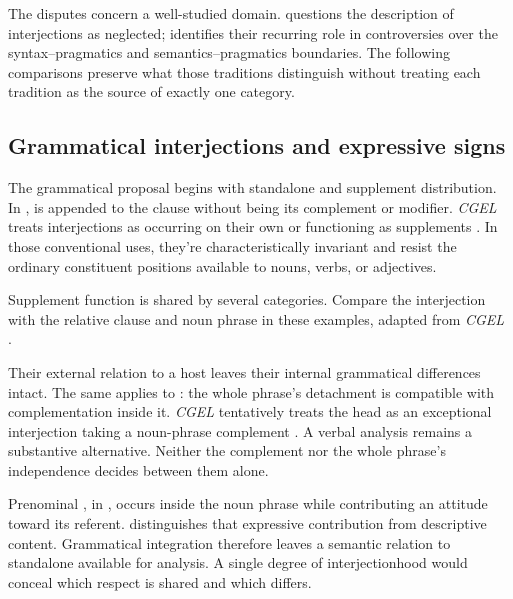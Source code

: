 The disputes concern a well-studied domain. \textcite{libert2019} questions
the description of interjections as neglected; \textcite[63]{cram2008}
identifies their recurring role in controversies over the syntax--pragmatics
and semantics--pragmatics boundaries. The following comparisons preserve
what those traditions distinguish without treating each tradition as the
source of exactly one category.

\subsection{Grammatical interjections and expressive signs}

The grammatical proposal begins with standalone and supplement distribution.
In ,  is appended to
the clause without being its complement or modifier. \textit{CGEL} treats
interjections as occurring on their own or functioning as supplements
\citep[1350, 1361]{HuddlestonPullum2002}. In those conventional uses,
they're characteristically invariant and resist the ordinary constituent
positions available to nouns, verbs, or adjectives.

Supplement function is shared by several categories. Compare the interjection
with the relative clause and noun phrase in these examples, adapted from
\textit{CGEL} \citep[1356--1357, 1360]{HuddlestonPullum2002}.

\ea\label{ex:supplements}
  \ea {}
  \ex {}
  \ex {}
  \z
\z

Their external relation to a host leaves their internal grammatical
differences intact. The same applies to :
the whole phrase's detachment is compatible with complementation inside it.
\textit{CGEL} tentatively treats the head as an exceptional interjection
taking a noun-phrase complement \citep[1361 n.~70]{HuddlestonPullum2002}.
A verbal analysis remains a substantive alternative. Neither the
complement nor the whole phrase's independence decides between them alone.

Prenominal , in , occurs inside the
noun phrase while contributing an attitude toward its referent.
\textcite[171, 182]{potts2007} distinguishes that expressive contribution
from descriptive content. Grammatical integration therefore leaves a
semantic relation to standalone  available for analysis.
A single degree of interjectionhood would conceal which respect is shared
and which differs.

